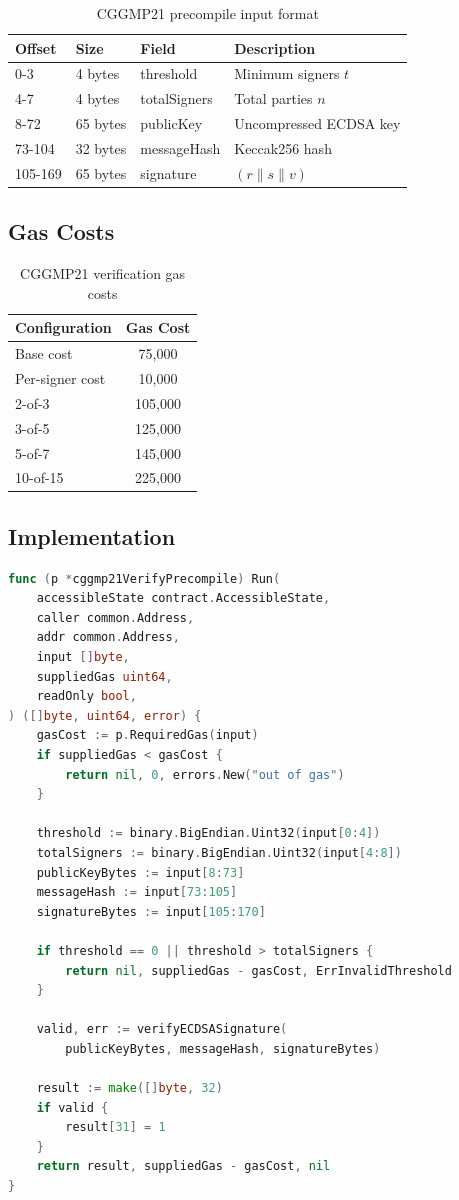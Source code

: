 \documentclass[11pt,a4paper]{article}
\theoremstyle{definition}
\begin{document}
\begin{table}[h]
\centering
\begin{tabular}{llll}
\toprule
Offset & Size & Field & Description \\
\midrule
0-3 & 4 bytes & threshold & Minimum signers $t$ \\
4-7 & 4 bytes & totalSigners & Total parties $n$ \\
8-72 & 65 bytes & publicKey & Uncompressed ECDSA key \\
73-104 & 32 bytes & messageHash & Keccak256 hash \\
105-169 & 65 bytes & signature & $(r \| s \| v)$ \\
\bottomrule
\end{tabular}
\caption{CGGMP21 precompile input format}
\end{table}

\subsection{Gas Costs}

\begin{table}[h]
\centering
\begin{tabular}{lc}
\toprule
Configuration & Gas Cost \\
\midrule
Base cost & 75,000 \\
Per-signer cost & 10,000 \\
\midrule
2-of-3 & 105,000 \\
3-of-5 & 125,000 \\
5-of-7 & 145,000 \\
10-of-15 & 225,000 \\
\bottomrule
\end{tabular}
\caption{CGGMP21 verification gas costs}
\end{table}

\subsection{Implementation}

\begin{lstlisting}[language=Go]
func (p *cggmp21VerifyPrecompile) Run(
    accessibleState contract.AccessibleState,
    caller common.Address,
    addr common.Address,
    input []byte,
    suppliedGas uint64,
    readOnly bool,
) ([]byte, uint64, error) {
    gasCost := p.RequiredGas(input)
    if suppliedGas < gasCost {
        return nil, 0, errors.New("out of gas")
    }

    threshold := binary.BigEndian.Uint32(input[0:4])
    totalSigners := binary.BigEndian.Uint32(input[4:8])
    publicKeyBytes := input[8:73]
    messageHash := input[73:105]
    signatureBytes := input[105:170]

    if threshold == 0 || threshold > totalSigners {
        return nil, suppliedGas - gasCost, ErrInvalidThreshold
    }

    valid, err := verifyECDSASignature(
        publicKeyBytes, messageHash, signatureBytes)

    result := make([]byte, 32)
    if valid {
        result[31] = 1
    }
    return result, suppliedGas - gasCost, nil
}
\end{lstlisting}
\end{document}
